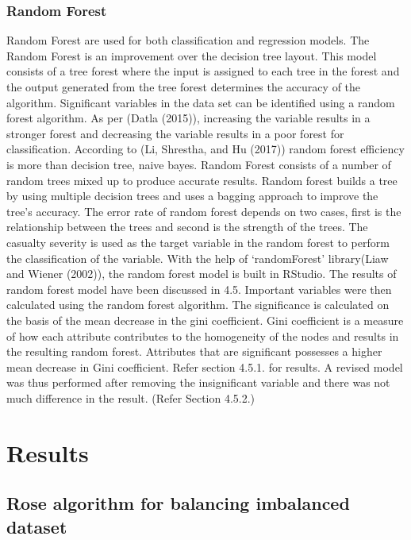 \documentclass[
  a4paper,
]{article}
\begin{document}
\hypertarget{random-forest}{%
\subsubsection{Random Forest}\label{random-forest}}

Random Forest are used for both classification and regression models.
The Random Forest is an improvement over the decision tree layout. This
model consists of a tree forest where the input is assigned to each tree
in the forest and the output generated from the tree forest determines
the accuracy of the algorithm. Significant variables in the data set can
be identified using a random forest algorithm. As per (Datla (2015)),
increasing the variable results in a stronger forest and decreasing the
variable results in a poor forest for classification. According to (Li,
Shrestha, and Hu (2017)) random forest efficiency is more than decision
tree, naive bayes. Random Forest consists of a number of random trees
mixed up to produce accurate results. Random forest builds a tree by
using multiple decision trees and uses a bagging approach to improve the
tree's accuracy. The error rate of random forest depends on two cases,
first is the relationship between the trees and second is the strength
of the trees. The casualty severity is used as the target variable in
the random forest to perform the classification of the variable. With
the help of `randomForest' library(Liaw and Wiener (2002)), the random
forest model is built in RStudio. The results of random forest model
have been discussed in 4.5. Important variables were then calculated
using the random forest algorithm. The significance is calculated on the
basis of the mean decrease in the gini coefficient. Gini coefficient is
a measure of how each attribute contributes to the homogeneity of the
nodes and results in the resulting random forest. Attributes that are
significant possesses a higher mean decrease in Gini coefficient. Refer
section 4.5.1. for results. A revised model was thus performed after
removing the insignificant variable and there was not much difference in
the result. (Refer Section 4.5.2.)

\newpage

\hypertarget{results}{%
\section{Results}\label{results}}

\hypertarget{rose-algorithm-for-balancing-imbalanced-dataset}{%
\subsection{Rose algorithm for balancing imbalanced
dataset}\label{rose-algorithm-for-balancing-imbalanced-dataset}}
\end{document}
